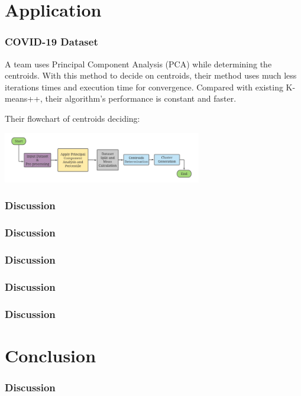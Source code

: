 \documentclass[9pt]{beamer}
\begin{document}
\section{Application}
\begin{frame}
	\frametitle{COVID-19 Dataset}
A team uses Principal Component Analysis (PCA)  while determining the centroids. With this method to decide on centroids, their method uses much less iterations times and execution time for convergence. Compared with existing K-means++, their algorithm's performance is constant and faster. \par
Their flowchart of centroids deciding:
\centerline{\includegraphics[width=0.65\textwidth]{figures/COVID19.png}}

\end{frame}



\begin{frame}
	\frametitle{Discussion}

\end{frame}

\begin{frame}
	\frametitle{Discussion}

\end{frame}

\begin{frame}
	\frametitle{Discussion}

\end{frame}

\begin{frame}
	\frametitle{Discussion}

\end{frame}

\begin{frame}
	\frametitle{Discussion}

\end{frame}

\section{Conclusion}
\begin{frame}
	\frametitle{Discussion}

\end{frame}
\end{document}

